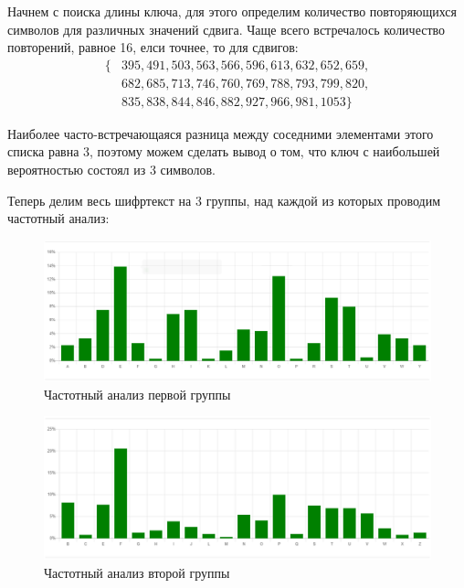 \documentclass[a4paper]{article}
\begin{document}
  Начнем с поиска длины ключа, для этого определим количество повторяющихся
  символов для различных значений сдвига. Чаще всего встречалось количество повторений,
  равное 16, елси точнее, то для сдвигов:
  \begin{equation}
    \begin{aligned}
    \{&395, 491, 503, 563, 566, 596, 613, 632, 652, 659,\\
           &682, 685, 713, 746, 760, 769, 788, 793, 799, 820,\\
           &835, 838, 844, 846, 882, 927, 966, 981, 1053\}
    \end{aligned}  
  \end{equation}

  Наиболее часто-встречающаяся разница между соседними элементами этого списка равна 3,
  поэтому можем сделать вывод о том, что ключ с наибольшей вероятностью состоял из 3 символов.

  Теперь делим весь шифртекст на 3 группы, над каждой из которых проводим частотный анализ:

  \begin{figure}[H]
    \centering
    \includegraphics[width=\textwidth]{03_0004}
    \caption{Частотный анализ первой группы}
  \end{figure}

  \begin{figure}[H]
    \centering
    \includegraphics[width=\textwidth]{03_0005}
    \caption{Частотный анализ второй группы}
  \end{figure}
\end{document}
